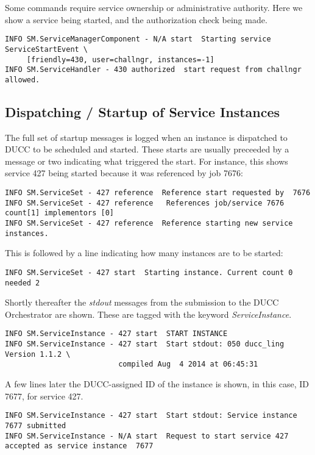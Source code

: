    Some commands require service ownership or administrative authority.  Here we show
   a service being started, and the authorization check being made.

\begin{verbatim}
INFO SM.ServiceManagerComponent - N/A start  Starting service ServiceStartEvent \
     [friendly=430, user=challngr, instances=-1]
INFO SM.ServiceHandler - 430 authorized  start request from challngr allowed.
\end{verbatim}

\subsection{Dispatching / Startup of Service Instances}
    The full set of startup messages is logged when an instance is dispatched to DUCC to
    be scheduled and started.  These starts are usually preceeded by a message or two
    indicating what triggered the start.  For instance, this shows service 427 being
    started because it was referenced by job 7676:

\begin{verbatim}
INFO SM.ServiceSet - 427 reference  Reference start requested by  7676
INFO SM.ServiceSet - 427 reference   References job/service 7676 count[1] implementors [0]
INFO SM.ServiceSet - 427 reference  Reference starting new service instances.
\end{verbatim}

    This is followed by a line indicating how many instances are to be started:
\begin{verbatim}
INFO SM.ServiceSet - 427 start  Starting instance. Current count 0 needed 2
\end{verbatim}

    Shortly thereafter the {\em stdout} messages from the submission to the
    DUCC Orchestrator are shown.  These are tagged with the keyword {\em ServiceInstance}.
\begin{verbatim}
INFO SM.ServiceInstance - 427 start  START INSTANCE
INFO SM.ServiceInstance - 427 start  Start stdout: 050 ducc_ling Version 1.1.2 \
                          compiled Aug  4 2014 at 06:45:31
\end{verbatim}
   
    A few lines later the DUCC-assigned ID of the instance is shown, in
    this case, ID 7677, for service 427.
\begin{verbatim}
INFO SM.ServiceInstance - 427 start  Start stdout: Service instance 7677 submitted
INFO SM.ServiceInstance - N/A start  Request to start service 427 accepted as service instance  7677
\end{verbatim}

